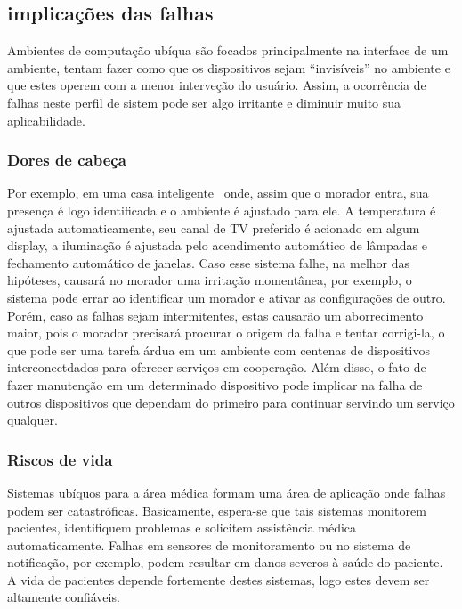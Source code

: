 
\subsection{implicações das falhas} %
\label{sub:implicacoes_das_falhas}

Ambientes de computação ubíqua são focados principalmente na interface de um ambiente, tentam fazer como que os dispositivos sejam ``invisíveis'' no ambiente e que estes operem com a menor interveção do usuário. Assim, a ocorrência de falhas neste perfil de sistem pode ser algo irritante e diminuir muito sua aplicabilidade.

\subsubsection*{Dores de cabeça}

Por exemplo, em uma casa inteligente~\cite{Kidd99} onde, assim que o morador entra, sua presença é logo identificada e o ambiente é ajustado para ele. A temperatura é ajustada automaticamente, seu canal de TV preferido é acionado em algum display, a iluminação é ajustada pelo acendimento automático de lâmpadas e fechamento automático de janelas. Caso esse sistema falhe, na melhor das hipóteses, causará no morador uma irritação momentânea, por exemplo, o sistema pode errar ao identificar um morador e ativar as configurações de outro. Porém, caso as falhas sejam intermitentes, estas causarão um aborrecimento maior, pois o morador precisará procurar o origem da falha e tentar corrigi-la, o que pode ser uma tarefa árdua em um ambiente com centenas de dispositivos interconectdados para oferecer serviços em cooperação. Além disso, o fato de fazer manutenção em um determinado dispositivo pode implicar na falha de outros dispositivos que dependam do primeiro para continuar servindo um serviço qualquer.

\subsubsection*{Riscos de vida}

Sistemas ubíquos para a área médica formam uma área de aplicação onde falhas podem ser catastróficas. Basicamente, espera-se que tais sistemas monitorem pacientes, identifiquem problemas e solicitem assistência médica automaticamente. Falhas em sensores de monitoramento ou no sistema de notificação, por exemplo, podem resultar em danos severos à saúde do paciente. A vida de pacientes depende fortemente destes sistemas, logo estes devem ser altamente confiáveis.

